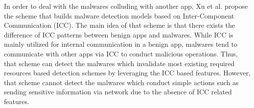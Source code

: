 In order to deal with the malwares colluding with another app, Xu et al. \cite{xu2016iccdetector} propose the scheme that builds malware detection models based on Inter-Component Communication (ICC).
The main idea of that scheme is that there exists the difference of ICC patterns between benign apps and malwares.
While ICC is mainly utilized for internal communication in a benign app, malwares tend to communicate with other apps via ICC to conduct malicious operations.
Thus, that scheme can detect the malwares which invalidate most existing required resources based detection schemes by leveraging the ICC based features.  
However, that scheme cannot detect the malwares which conduct simple actions such as sending sensitive information via network due to the absence of ICC related features.




